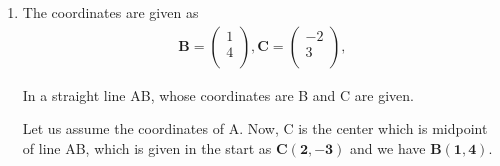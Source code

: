 \documentclass[12pt]{article}
\newcommand{\myvec}[1]{\ensuremath{\begin{pmatrix}#1\end{pmatrix}}}
\let\vec\mathbf
\begin{document}
\begin{enumerate}
\item The coordinates are given as
	\begin{align}
	\vec{B} = \myvec{
		1\\
	    4\\
		},
	\vec{C} = \myvec{
	   -2\\
		3\\
		},
	\end{align}
	
In a straight line AB, whose coordinates are B and C are given.
	


Let us assume the coordinates of A. Now, C is the center which is midpoint of line AB, which is given in the start as $\vec{C(2, -3)}$ and we have $\vec{B(1,4)}$.
		

\end{enumerate}
\end{document}
